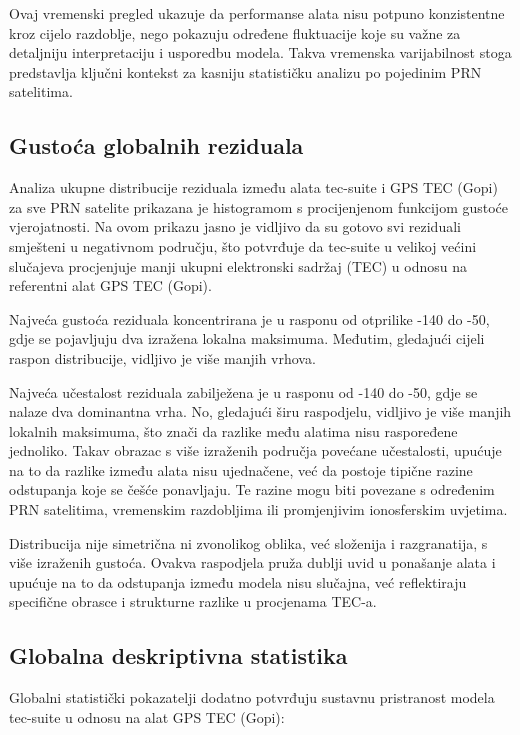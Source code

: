 \documentclass[
]{article}
\begin{document}
Ovaj vremenski pregled ukazuje da performanse alata nisu potpuno
konzistentne kroz cijelo razdoblje, nego pokazuju određene fluktuacije
koje su važne za detaljniju interpretaciju i usporedbu modela. Takva
vremenska varijabilnost stoga predstavlja ključni kontekst za kasniju
statističku analizu po pojedinim PRN satelitima.

\subsection{Gustoća globalnih
reziduala}\label{gustoux107a-globalnih-reziduala}

Analiza ukupne distribucije reziduala između alata tec-suite i GPS TEC
(Gopi) za sve PRN satelite prikazana je histogramom s procijenjenom
funkcijom gustoće vjerojatnosti. Na ovom prikazu jasno je vidljivo da su
gotovo svi reziduali smješteni u negativnom području, što potvrđuje da
tec-suite u velikoj većini slučajeva procjenjuje manji ukupni
elektronski sadržaj (TEC) u odnosu na referentni alat GPS TEC (Gopi).

Najveća gustoća reziduala koncentrirana je u rasponu od otprilike -140
do -50, gdje se pojavljuju dva izražena lokalna maksimuma. Međutim,
gledajući cijeli raspon distribucije, vidljivo je više manjih vrhova.

Najveća učestalost reziduala zabilježena je u rasponu od -140 do -50,
gdje se nalaze dva dominantna vrha. No, gledajući širu raspodjelu,
vidljivo je više manjih lokalnih maksimuma, što znači da razlike među
alatima nisu raspoređene jednoliko. Takav obrazac s više izraženih
područja povećane učestalosti, upućuje na to da razlike između alata
nisu ujednačene, već da postoje tipične razine odstupanja koje se češće
ponavljaju. Te razine mogu biti povezane s određenim PRN satelitima,
vremenskim razdobljima ili promjenjivim ionosferskim uvjetima.

Distribucija nije simetrična ni zvonolikog oblika, već složenija i
razgranatija, s više izraženih gustoća. Ovakva raspodjela pruža dublji
uvid u ponašanje alata i upućuje na to da odstupanja između modela nisu
slučajna, već reflektiraju specifične obrasce i strukturne razlike u
procjenama TEC-a.

\subsection{Globalna deskriptivna
statistika}\label{globalna-deskriptivna-statistika}

Globalni statistički pokazatelji dodatno potvrđuju sustavnu pristranost
modela tec-suite u odnosu na alat GPS TEC (Gopi):
\end{document}
